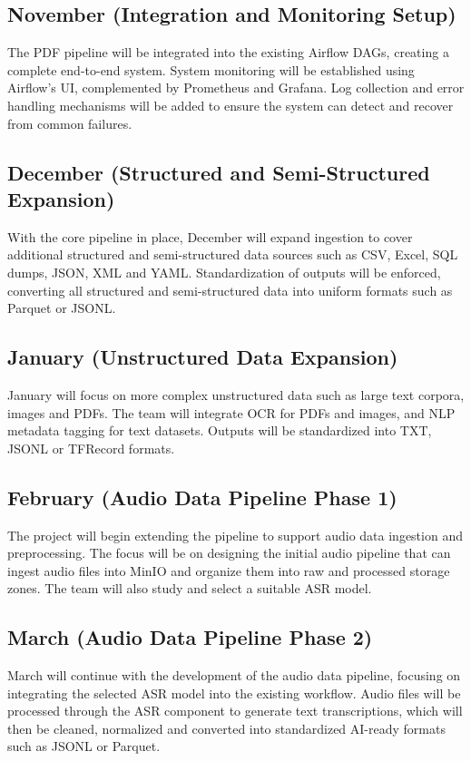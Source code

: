 \documentclass[12pt,oneside,openright,a4paper]{cpe-english-project}
\begin{document}
\subsection{November (Integration and Monitoring Setup)}
The PDF pipeline will be integrated into the existing Airflow DAGs, creating a complete end-to-end system. System monitoring will be established using Airflow's UI, complemented by Prometheus and Grafana. Log collection and error handling mechanisms will be added to ensure the system can detect and recover from common failures.

\subsection{December (Structured and Semi-Structured Expansion)}
With the core pipeline in place, December will expand ingestion to cover additional structured and semi-structured data sources such as CSV, Excel, SQL dumps, JSON, XML and YAML. Standardization of outputs will be enforced, converting all structured and semi-structured data into uniform formats such as Parquet or JSONL.

\subsection{January (Unstructured Data Expansion)}
January will focus on more complex unstructured data such as large text corpora, images and PDFs. The team will integrate OCR for PDFs and images, and NLP metadata tagging for text datasets. Outputs will be standardized into TXT, JSONL or TFRecord formats.

\subsection{February (Audio Data Pipeline Phase 1)}
The project will begin extending the pipeline to support audio data ingestion and preprocessing. The focus will be on designing the initial audio pipeline that can ingest audio files into MinIO and organize them into raw and processed storage zones. The team will also study and select a suitable ASR model.

\subsection{March (Audio Data Pipeline Phase 2)}
March will continue with the development of the audio data pipeline, focusing on integrating the selected ASR model into the existing workflow. Audio files will be processed through the ASR component to generate text transcriptions, which will then be cleaned, normalized and converted into standardized AI-ready formats such as JSONL or Parquet.
\end{document}
